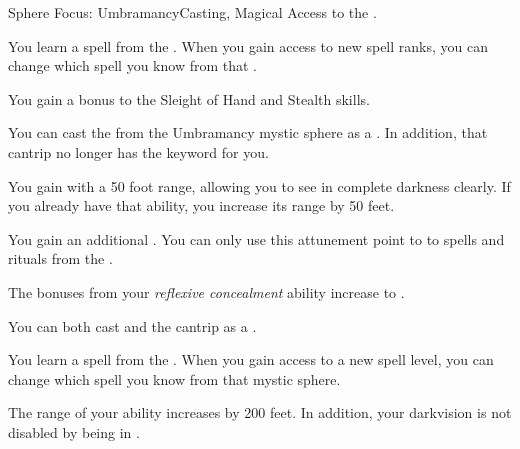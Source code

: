     \begin{feat}{Sphere Focus: Umbramancy}{Casting, Magical}
        \featpre Access to the  .

         You learn a spell from the  .
        When you gain access to new spell ranks, you can change which spell you know from that .

         You gain a  bonus to the Sleight of Hand and Stealth skills.

         You can cast the   from the Umbramancy mystic sphere as a .
        In addition, that cantrip no longer has the  keyword for you.

         You gain  with a 50 foot range, allowing you to see in complete darkness clearly.
        If you already have that ability, you increase its range by 50 feet.

         You gain an additional .
        You can only use this attunement point to  to spells and rituals from the  .

         The bonuses from your \textit{reflexive concealment} ability increase to .

         You can both cast and  the  cantrip as a .

         You learn a spell from the  .
        When you gain access to a new spell level, you can change which spell you know from that mystic sphere.

         The range of your  ability increases by 200 feet.
        In addition, your darkvision is not disabled by being in .
    \end{feat}

